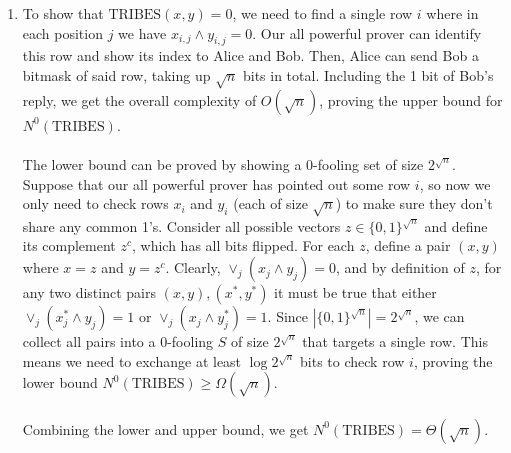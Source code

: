 \documentclass{article}
\begin{document}
\begin{enumerate}
\begin{enumerate}[label=(\alph*)]
            \item To show that $\textrm{TRIBES}(x,y) = 0$, we need to find a
                single row $i$ where in each position $j$ we have $x_{i,j}
                \land y_{i,j} = 0$. Our all powerful prover can identify this
                row and show its index to Alice and Bob. Then, Alice can send
                Bob a bitmask of said row, taking up $\sqrt{n}$ bits in total.
                Including the 1 bit of Bob's reply, we get the overall
                complexity of $O(\sqrt{n})$, proving the upper bound for
                $N^0(\textrm{TRIBES})$.
                \\\\
                The lower bound can be proved by showing a 0-fooling set of
                size $2^{\sqrt{n}}$. Suppose that our all powerful prover has
                pointed out some row $i$, so now we only need to check rows
                $x_i$ and $y_i$ (each of size $\sqrt{n}$) to make sure they
                don't share any common 1's. Consider all possible vectors $z
                \in \{0, 1\}^{\sqrt{n}}$ and define its complement $z^c$, which
                has all bits flipped. For each $z$, define a pair $(x,y)$ where
                $x = z$ and $y = z^c$. Clearly, $\lor_j(x_j \land y_j) = 0$,
                and by definition of $z$, for any two distinct pairs $(x, y),
                (x^*, y^*)$ it must be true that either $\lor_j(x^*_j \land
                y_j) = 1$ or $\lor_j(x_j \land y^*_j) = 1$. Since $|\{0,
                1\}^{\sqrt{n}}| = 2^{\sqrt{n}}$, we can collect all pairs into
                a 0-fooling $S$ of size $2^{\sqrt{n}}$ that targets a single
                row. This means we need to exchange at least $\log
                2^{\sqrt{n}}$ bits to check row $i$, proving the lower bound
                $N^0(\textrm{TRIBES}) \geq \Omega(\sqrt{n})$.
                \\\\
                Combining the lower and upper bound, we get
                $N^0(\textrm{TRIBES}) = \Theta(\sqrt{n})$.
                \\
        \end{enumerate}


\end{enumerate}
\end{document}
